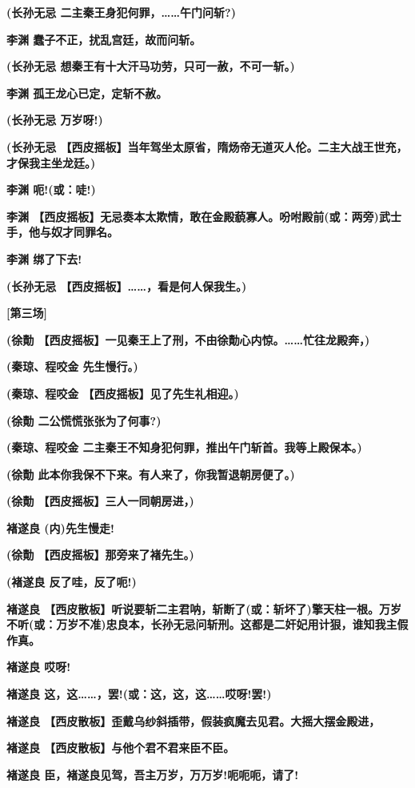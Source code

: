 \textbf{(长孙无忌 二主秦王身犯何罪，\ldots{}\ldots{}午门问斩?)}

\textbf{李渊 蠢子不正，扰乱宫廷，故而问斩。}

\textbf{(长孙无忌 想秦王有十大汗马功劳，只可一赦，不可一斩。)}

\textbf{李渊 孤王龙心已定，定斩不赦。}

\textbf{(长孙无忌 万岁呀!)}

\textbf{(长孙无忌
【西皮摇板】当年驾坐太原省，隋炀帝无道灭人伦。二主大战王世充，才保我主坐龙廷。)}

\textbf{李渊 呃!(或：唗!)}

\textbf{李渊
【西皮摇板】无忌奏本太欺情，敢在金殿藐寡人。吩咐殿前(或：两旁)武士手，他与奴才同罪名。}

\textbf{李渊 绑了下去!}

\textbf{(长孙无忌 【西皮摇板】\ldots{}\ldots{}，看是何人保我生。)}

\textbf{{[}第三场{]}}

\textbf{(徐勣
【西皮摇板】一见秦王上了刑，不由徐勣心内惊。\ldots{}\ldots{}忙往龙殿奔，)}

\textbf{(秦琼、程咬金 先生慢行。)}

\textbf{(秦琼、程咬金 【西皮摇板】见了先生礼相迎。)}

\textbf{(徐勣 二公慌慌张张为了何事?)}

\textbf{(秦琼、程咬金
二主秦王不知身犯何罪，推出午门斩首。我等上殿保本。)}

\textbf{(徐勣 此本你我保不下来。有人来了，你我暂退朝房便了。)}

\textbf{(徐勣 【西皮摇板】三人一同朝房进，)}

\textbf{褚遂良 (内)先生慢走!}

\textbf{(徐勣 【西皮摇板】那旁来了褚先生。)}

\textbf{(褚遂良 反了哇，反了呃!)}

\textbf{褚遂良
【西皮散板】听说要斩二主君呐，斩断了(或：斩坏了)擎天柱一根。万岁不听(或：万岁不准)忠良本，长孙无忌问斩刑。这都是二奸妃用计狠，谁知我主假作真。}

\textbf{褚遂良 哎呀!}

\textbf{褚遂良
这，这\ldots{}\ldots{}，罢!(或：这，这，这\ldots{}\ldots{}哎呀!罢!)}

\textbf{褚遂良
【西皮散板】歪戴乌纱斜插带，假装疯魔去见君。大摇大摆金殿进，}

\textbf{褚遂良 【西皮散板】与他个君不君来臣不臣。}

\textbf{褚遂良 臣，褚遂良见驾，吾主万岁，万万岁!呃呃呃，请了!}


